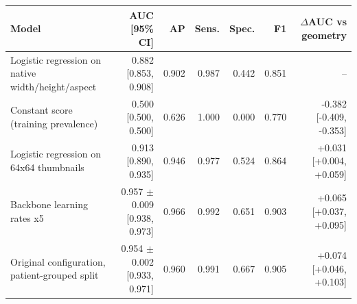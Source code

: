 \begin{tabular}{lrrrrrr}
\toprule
Model & AUC [95\% CI] & AP & Sens. & Spec. & F1 & $\Delta$AUC vs geometry \\
\midrule
Logistic regression on native width/height/aspect & 0.882 [0.853, 0.908] & 0.902 & 0.987 & 0.442 & 0.851 & -- \\
Constant score (training prevalence) & 0.500 [0.500, 0.500] & 0.626 & 1.000 & 0.000 & 0.770 & -0.382 [-0.409, -0.353] \\
Logistic regression on 64x64 thumbnails & 0.913 [0.890, 0.935] & 0.946 & 0.977 & 0.524 & 0.864 & +0.031 [+0.004, +0.059] \\
\midrule
Backbone learning rates x5 & 0.957 $\pm$ 0.009 [0.938, 0.973] & 0.966 & 0.992 & 0.651 & 0.903 & +0.065 [+0.037, +0.095] \\
Original configuration, patient-grouped split & 0.954 $\pm$ 0.002 [0.933, 0.971] & 0.960 & 0.991 & 0.667 & 0.905 & +0.074 [+0.046, +0.103] \\
\bottomrule
\end{tabular}